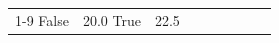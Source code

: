 \begin{table}[H]
\begin{tabular}{lllrlllll}
\cline{1-9}
False & 20.0%
\cline{1-9}
True & 22.5%

\end{tabular}
\end{table}
